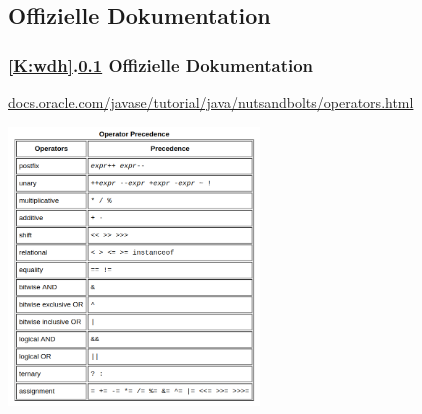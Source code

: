 \documentclass[c,18pt]{beamer}
\begin{document}
\def\stitle{Offizielle Dokumentation}
\subsection{\stitle}\label{S:Dokumentation}
\begin{frame}[fragile]%
  \frametitle{\ref{K:wdh}.\ref{S:Dokumentation} \stitle}%
\textcolor{KITblue}{\url{docs.oracle.com/javase/tutorial/java/nutsandbolts/operators.html}}

\begin{center}
\includegraphics[width=0.5\textwidth]{grundl-boolalgnegation/operatorPrecedence}
\end{center}
\end{frame}


\def\stitle{De Morgansche Gesetze}
\end{document}
